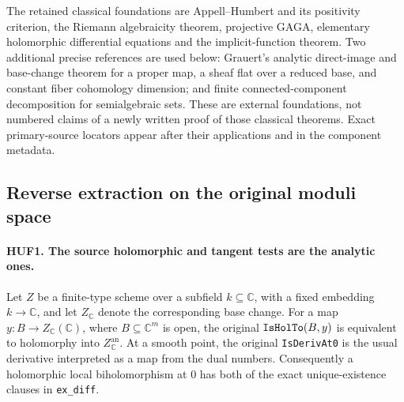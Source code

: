 \documentclass[11pt,a4paper]{article}
\numberwithin{equation}{section}
\theoremstyle{remark}\newtheorem{remark}[theorem]{Remark}
\begin{document}
The retained classical foundations are Appell--Humbert and its
positivity criterion, the Riemann algebraicity theorem, projective
GAGA, elementary holomorphic differential equations and the
implicit-function theorem.  Two additional precise references are
used below: Grauert's analytic direct-image and base-change theorem
for a proper map, a sheaf flat over a reduced base, and constant
fiber cohomology dimension; and finite connected-component
decomposition for semialgebraic sets.  These are external foundations,
not numbered claims of a newly written proof of those classical
theorems.  Exact primary-source locators appear after their applications
and in the component metadata.

\subsection{Reverse extraction on the original moduli space}

\paragraph{HUF1. The source holomorphic and tangent tests are the analytic ones.}
\label{claim:HUF1}
Let \(Z\) be a finite-type scheme over a subfield \(k\subseteq\mathbb C\),
with a fixed embedding \(k\to\mathbb C\), and let
\(Z_\mathbb C\) denote the corresponding base change.
For a map \(y:B\to Z_\mathbb C(\mathbb C)\), where
\(B\subseteq\mathbb C^m\) is open, the original
\(\texttt{Is\allowbreak Hol\allowbreak To}(B,y)\) is equivalent to holomorphy into
\(Z_\mathbb C^{\mathrm{an}}\).
At a smooth point, the original \texttt{Is\allowbreak Deriv\allowbreak At0} is the
usual derivative interpreted as a map from the dual numbers.
Consequently a holomorphic local biholomorphism at \(0\) has
both of the exact unique-existence clauses in \texttt{ex\_\allowbreak diff}.
\end{document}
